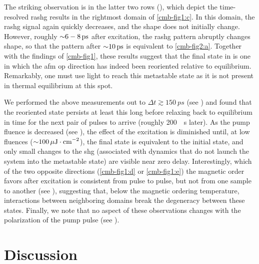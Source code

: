 The striking observation is in the latter two rows (), which depict the time-resolved \gls{rashg} results in the rightmost domain of \cref{cmb-fig1:c}.
In this domain, the \gls{rashg} signal again quickly decreases, and the shape does not initially change.
However, roughly ${\sim} \num{6}-\qty{8}{ps}$ after excitation, the \gls{rashg} pattern abruptly changes shape, so that the pattern after ${\sim} \qty{10}{ps}$ is equivalent to \cref{cmb-fig2:a}.
Together with the findings of \cref{cmb-fig1}, these results suggest that the final state in  is one in which the \gls{afm} \gls{op} direction has indeed been reoriented relative to equilibrium.
Remarkably, one must use light to reach this metastable state as it is not present in thermal equilibrium at this spot.

We performed the above measurements out to $\Delta t \gtrsim \qty{150}{ps}$ (see ) and found that the reoriented state persists at least this long before relaxing back to equilibrium in time for the next pair of pulses to arrive (roughly \qty{200}{\mu s} later).
As the pump fluence is decreased (see ), the effect of the excitation is diminished until, at low fluences (${\sim} \qty{100}{\mu J \cdot cm^{-2}}$), the final state is equivalent to the initial state, and only small changes to the \gls{shg} (associated with dynamics that do not launch the system into the metastable state) are visible near zero delay.
Interestingly, which of the two opposite directions (\cref{cmb-fig1:d} or \cref{cmb-fig1:e}) the magnetic order favors after excitation is consistent from pulse to pulse, but not from one sample to another (see ), suggesting that, below the magnetic ordering temperature, interactions between neighboring domains break the degeneracy between these states.
Finally, we note that no aspect of these observations changes with the polarization of the pump pulse (see ).

\section{Discussion}

